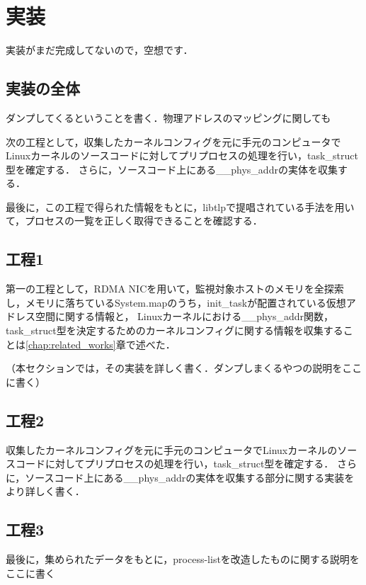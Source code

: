 \chapter{実装}
\label{chap:implementation}

実装がまだ完成してないので，空想です．

\section{実装の全体}

ダンプしてくるということを書く．物理アドレスのマッピングに関しても

次の工程として，収集したカーネルコンフィグを元に手元のコンピュータでLinuxカーネルのソースコードに対してプリプロセスの処理を行い，task_struct型を確定する．
さらに，ソースコード上にある__phys_addrの実体を収集する．

最後に，この工程で得られた情報をもとに，libtlpで提唱されている手法を用いて，プロセスの一覧を正しく取得できることを確認する．

\section{工程1}

第一の工程として，RDMA NICを用いて，監視対象ホストのメモリを全探索し，メモリに落ちているSystem.mapのうち，init_taskが配置されている仮想アドレス空間に関する情報と，
Linuxカーネルにおける__phys_addr関数，task_struct型を決定するためのカーネルコンフィグに関する情報を収集することは\ref{chap:related_works}章で述べた．

（本セクションでは，その実装を詳しく書く．ダンプしまくるやつの説明をここに書く）

\section{工程2}

収集したカーネルコンフィグを元に手元のコンピュータでLinuxカーネルのソースコードに対してプリプロセスの処理を行い，task_struct型を確定する．
さらに，ソースコード上にある__phys_addrの実体を収集する部分に関する実装をより詳しく書く．

\section{工程3}

最後に，集められたデータをもとに，process-listを改造したものに関する説明をここに書く
